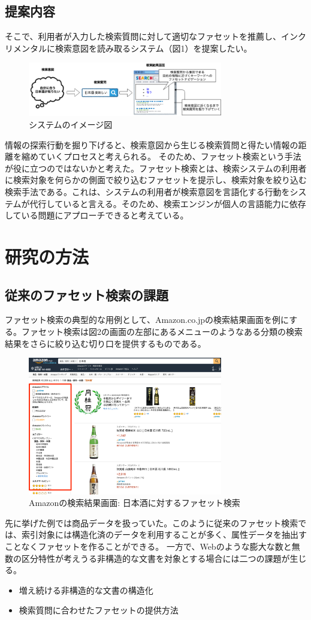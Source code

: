 \documentclass[a4j,10pt, twocolumn]{jarticle}
\begin{document}
\subsection{提案内容}

 そこで、利用者が入力した検索質問に対して適切なファセットを推薦し、インクリメンタルに検索意図を読み取るシステム（図1）を提案したい。

 \begin{figure}[h]
   \includegraphics[width=85mm]{./new_ir_with_navi.png}
   \caption{システムのイメージ図}
 \end{figure}
 
 情報の探索行動を掘り下げると、検索意図から生じる検索質問と得たい情報の距離を縮めていくプロセスと考えられる。 そのため、ファセット検索という手法が役に立つのではないかと考えた。ファセット検索とは、検索システムの利用者に検索対象を何らかの側面で絞り込むファセットを提示し、検索対象を絞り込む検索手法である\cite{faceted}。これは、システムの利用者が検索意図を言語化する行動をシステムが代行していると言える。そのため、検索エンジンが個人の言語能力に依存している問題にアプローチできると考えている。
\section{研究の方法}
\subsection{従来のファセット検索の課題}
 ファセット検索の典型的な用例として、Amazon.co.jp\cite{amazon}の検索結果画面を例にする。ファセット検索は図2の画面の左部にあるメニューのようなある分類の検索結果をさらに絞り込む切り口を提供するものである。
 \begin{figure}[h]
   \includegraphics[width=85mm]{./amazon.png}
   \caption{Amazonの検索結果画面: 日本酒に対するファセット検索}
 \end{figure}
  先に挙げた例では商品データを扱っていた。このように従来のファセット検索では、索引対象には構造化済のデータを利用することが多く、属性データを抽出すことなくファセットを作ることができる。
  一方で、Webのような膨大な数と無数の区分特性が考えうる非構造的な文書を対象とする場合には二つの課題が生じる。
\begin{itemize}
  \item 増え続ける非構造的な文書の構造化
  \item 検索質問に合わせたファセットの提供方法
\end{itemize}
\end{document}
